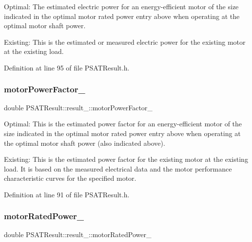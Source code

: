 Optimal\+: The estimated electric power for an energy-\/efficient motor of the size indicated in the optimal motor rated power entry above when operating at the optimal motor shaft power. 

Existing\+: This is the estimated or measured electric power for the existing motor at the existing load. 

Definition at line 95 of file P\+S\+A\+T\+Result.\+h.

\mbox{\label{struct_p_s_a_t_result_1_1result___ad52a7dc3e6841efa64cd202fab047ac3}} 
\subsubsection{\texorpdfstring{motor\+Power\+Factor\+\_\+}{motorPowerFactor\_}}
{\footnotesize\ttfamily double P\+S\+A\+T\+Result\+::result\+\_\+\+::motor\+Power\+Factor\+\_\+}



Optimal\+: This is the estimated power factor for an energy-\/efficient motor of the size indicated in the optimal motor rated power entry above when operating at the optimal motor shaft power (also indicated above). 

Existing\+: This is the estimated power factor for the existing motor at the existing load. It is based on the measured electrical data and the motor performance characteristic curves for the specified motor. 

Definition at line 91 of file P\+S\+A\+T\+Result.\+h.

\mbox{\label{struct_p_s_a_t_result_1_1result___a7debf54d8680536c141a64d758fa5e4b}} 
\subsubsection{\texorpdfstring{motor\+Rated\+Power\+\_\+}{motorRatedPower\_}}
{\footnotesize\ttfamily double P\+S\+A\+T\+Result\+::result\+\_\+\+::motor\+Rated\+Power\+\_\+}



